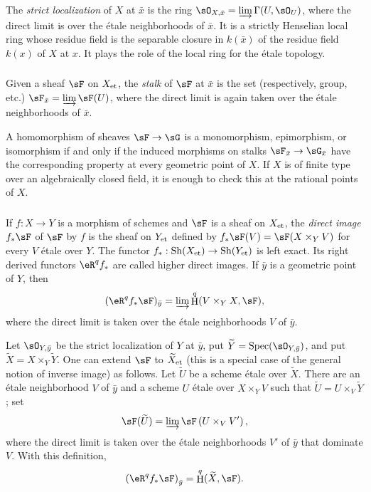 \documentclass[12pt,oneside,english]{smfbook}
\DeclareMathOperator{\h}{H}
\DeclareMathOperator{\sh}{Sh}
\DeclareMathOperator{\spec}{Spec}
\newcommand{\et}[1]{{#1}_{\textnormal{et}}}
\begin{document}
The \emph{strict localization} of $X$ at $\bar x$ is the ring $\sO_{X,\bar x}=\varinjlim\Gamma(U,\sO_U)$, where the direct limit is over the étale neighborhoods of $\bar x$. It is a strictly Henselian local ring whose residue field is the separable closure in $k(\bar x)$ of the residue field $k(x)$ of $X$ at $x$. It plays the role of the local ring for the étale topology.

\subsubsection{}\label{I:2-3-2}

Given a sheaf $\sF$ on $\et X$, the \emph{stalk} of $\sF$ at $\bar x$ is the set (respectively, group, etc.) $\sF_{\bar x}=\varinjlim\sF(U)$, where the direct limit is again taken over the étale neighborhoods of $\bar x$.

A homomorphism of sheaves $\sF\to\sG$ is a monomorphism, epimorphism, or isomorphism if and only if the induced morphisms on stalks $\sF_{\bar x}\to\sG_{\bar x}$ have the corresponding property at every geometric point of $X$. If $X$ is of finite type over an algebraically closed field, it is enough to check this at the rational points of $X$.

\subsubsection{}\label{I:2-3-3}

If $f:X\to Y$ is a morphism of schemes and $\sF$ is a sheaf on $\et X$, the \emph{direct image} $f_*\sF$ of $\sF$ by $f$ is the sheaf on $\et Y$ defined by $f_*\sF(V)=\sF(X\times_YV)$ for every $V$ étale over $Y$. The functor $f_*:\sh(\et X)\to\sh(\et Y)$ is left exact. Its right derived functors $\eR^qf_*$ are called higher direct images. If $\bar y$ is a geometric point of $Y$, then
\[
  (\eR^q f_* \sF)_{\bar y} = \varinjlim \h^q(V\times_Y X,\sF)\text{,}
\]
where the direct limit is taken over the étale neighborhoods $V$ of $\bar y$.

Let $\sO_{Y,\bar y}$ be the strict localization of $Y$ at $\bar y$, put $\widetilde Y=\spec(\sO_{Y,\bar y})$, and put $\widetilde X=X\times_Y\widetilde Y$. One can extend $\sF$ to $\et{\widetilde X}$ (this is a special case of the general notion of inverse image) as follows. Let $\widetilde U$ be a scheme étale over $\widetilde X$. There are an étale neighborhood $V$ of $\bar y$ and a scheme $U$ étale over $X\times_YV$ such that $\widetilde U=U\times_V\widetilde Y$; set
\[
  \sF(\widetilde U)=\varinjlim \sF\left(U\times_V V'\right)\text{,}
\]
where the direct limit is taken over the étale neighborhoods $V'$ of $\bar y$ that dominate $V$. With this definition,
\[
  \left(\eR^q f_* \sF\right)_{\bar y} = \h^q(\widetilde X,\sF)\text{.}
\]
\end{document}
